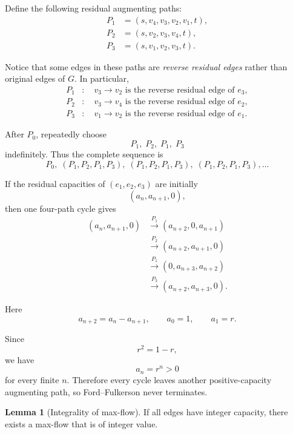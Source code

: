 \documentclass[10pt]{article}
\theoremstyle{definition}
\newtheorem{lemma}[definition]{Lemma}
\begin{document}
Define the following residual augmenting paths:
\begin{align*}
P_1 &= (s,v_4,v_3,v_2,v_1,t),\\
P_2 &= (s,v_2,v_3,v_4,t),\\
P_3 &= (s,v_1,v_2,v_3,t).
\end{align*}

Notice that some edges in these paths are
\emph{reverse residual edges} rather than original edges of $G$.
In particular,
\begin{align*}
P_1 &: \quad v_3 \to v_2
      \text{ is the reverse residual edge of }e_3,\\
P_2 &: \quad v_3 \to v_4
      \text{ is the reverse residual edge of }e_2,\\
P_3 &: \quad v_1 \to v_2
      \text{ is the reverse residual edge of }e_1.
\end{align*}

After $P_0$, repeatedly choose
\[
\boxed{
P_1,\;P_2,\;P_1,\;P_3
}
\]
indefinitely. Thus the complete sequence is
\[
\boxed{
P_0,\;
(P_1,P_2,P_1,P_3),\;
(P_1,P_2,P_1,P_3),\;
(P_1,P_2,P_1,P_3),\ldots
}
\]

If the residual capacities of $(e_1,e_2,e_3)$ are initially
\[
(a_n,a_{n+1},0),
\]
then one four-path cycle gives
\begin{align*}
(a_n,a_{n+1},0)
&\xrightarrow{P_1}
(a_{n+2},0,a_{n+1})\\
&\xrightarrow{P_2}
(a_{n+2},a_{n+1},0)\\
&\xrightarrow{P_1}
(0,a_{n+3},a_{n+2})\\
&\xrightarrow{P_3}
(a_{n+2},a_{n+3},0).
\end{align*}

Here
\[
a_{n+2}=a_n-a_{n+1},
\qquad
a_0=1,
\qquad
a_1=r.
\]

Since
\[
r^2=1-r,
\]
we have
\[
a_n=r^n>0
\]
for every finite $n$. Therefore every cycle leaves another
positive-capacity augmenting path, so Ford--Fulkerson never terminates.



\begin{lemma}[Integrality of max-flow]
If all edges have integer capacity, there exists a max-flow that is of integer value.
\end{lemma}
\end{document}
